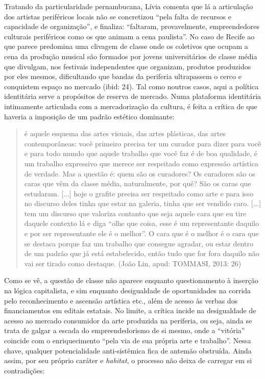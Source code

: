 Tratando da particularidade pernambucana, Lívia comenta que lá a
articulação dos artistas periféricos locais não se concretizou ``pela
falta de recursos e capacidade de organização'', e finaliza: ``faltaram,
provavelmente, empreendedores culturais periféricos como os que animam a
cena paulista''. No caso de Recife ao que parece predomina uma clivagem
de classe onde os coletivos que ocupam a cena da produção musical são
formados por jovens universitários de classe média que divulgam, nos
festivais independentes que organizam, produtos produzidos por eles
mesmos, dificultando que bandas da periferia ultrapassem o cerco e
conquistem espaço no mercado (ibid: 24). Tal como noutros casos, aqui a
política identitária serve a propósitos de reserva de mercado. Numa
plataforma identitária intimamente articulada com a mercadorização da
cultura, é feita a crítica de que haveria a imposição de um padrão
estético dominante:

\begin{quote}
é aquele esquema das artes visuais, das artes plásticas, das artes
contemporâneas: você primeiro precisa ter um curador para dizer para
você e para todo mundo que aquele trabalho que você faz é de boa
qualidade, é um trabalho expressivo que merece ser respeitado como
expressão artística de verdade. Mas a questão é: quem são os curadores?
Os curadores são os caras que vêm da classe média, naturalmente, por
quê? São os caras que estudaram. {[}...{]} hoje o grafite precisa ser
respeitado como arte e para isso no discurso deles tinha que estar na
galeria, tinha que ser vendido caro. {[}...{]} tem um discurso que
valoriza contanto que seja aquele cara que eu tire daquele contexto lá e
diga ``olhe que coisa, esse é um representante daquilo e por ser
representante ele é o melhor''. O cara que é o melhor é o cara que se
destaca porque faz um trabalho que consegue agradar, ou estar dentro de
um padrão que já está estabelecido, então tudo que for fora daquilo não
vai ser tirado como destaque. (João Lin, apud: TOMMASI, 2013: 26)
\end{quote}

Como se vê, a questão de classe não aparece enquanto questionamento à
inserção na lógica capitalista, e sim enquanto desigualdade de
oportunidades na corrida pelo reconhecimento e ascensão artística etc.,
além de acesso às verbas dos financiamentos em editais estatais. No
limite, a crítica incide na desigualdade de acesso ao mercado consumidor
da arte produzida na periferia, ou seja, ainda se trata de galgar a
escada do empreendedorismo de si mesmo, onde a ``vitória'' coincide com
o enriquecimento ``pela via de sua própria arte e trabalho''. Nessa
chave, qualquer potencialidade anti-sistêmica fica de antemão obstruída.
Ainda assim, por seu próprio caráter e \emph{habitat}, o processo não
deixa de carregar em si contradições:

